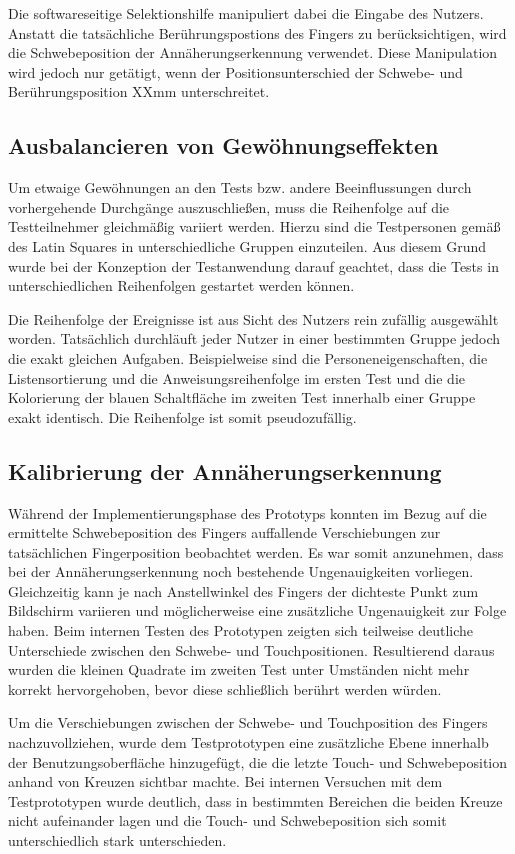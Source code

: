 \documentclass[a4paper,12pt,bibliography=totoc]{scrreprt}%
\begin{document}
Die softwareseitige Selektionshilfe manipuliert dabei die Eingabe des Nutzers. Anstatt die tatsächliche Berührungspostions des Fingers zu berücksichtigen, wird die Schwebeposition der Annäherungserkennung verwendet. Diese Manipulation wird jedoch nur getätigt, wenn der Positionsunterschied der Schwebe- und Berührungsposition XXmm unterschreitet.

\subsection{Ausbalancieren von Gewöhnungseffekten}
Um etwaige Gewöhnungen an den Tests bzw. andere Beeinflussungen durch vorhergehende Durchgänge auszuschließen, muss die Reihenfolge auf die Testteilnehmer gleichmäßig variiert werden. Hierzu sind die Testpersonen gemäß des Latin Squares in unterschiedliche Gruppen einzuteilen. Aus diesem Grund wurde bei der Konzeption der Testanwendung darauf geachtet, dass die Tests in unterschiedlichen Reihenfolgen gestartet werden können.

Die Reihenfolge der Ereignisse ist aus Sicht des Nutzers rein zufällig ausgewählt worden. Tatsächlich durchläuft jeder Nutzer in einer bestimmten Gruppe jedoch die exakt gleichen Aufgaben. Beispielweise sind die Personeneigenschaften, die Listensortierung und die Anweisungsreihenfolge im ersten Test und die die Kolorierung der blauen Schaltfläche im zweiten Test innerhalb einer Gruppe exakt identisch. Die Reihenfolge ist somit pseudozufällig.

\subsection{Kalibrierung der Annäherungserkennung}
Während der Implementierungsphase des Prototyps konnten im Bezug auf die ermittelte Schwebeposition des Fingers auffallende  Verschiebungen zur tatsächlichen Fingerposition beobachtet werden. Es war somit anzunehmen, dass bei der Annäherungserkennung noch bestehende Ungenauigkeiten vorliegen. Gleichzeitig kann je nach Anstellwinkel des Fingers der dichteste Punkt zum Bildschirm variieren und möglicherweise eine zusätzliche Ungenauigkeit zur Folge haben. Beim internen Testen des Prototypen zeigten sich teilweise deutliche Unterschiede zwischen den Schwebe- und Touchpositionen. Resultierend daraus wurden die kleinen Quadrate im zweiten Test unter Umständen nicht mehr korrekt hervorgehoben, bevor diese schließlich berührt werden würden.

Um die Verschiebungen zwischen der Schwebe- und Touchposition des Fingers nachzuvollziehen, wurde dem Testprototypen eine zusätzliche Ebene innerhalb der Benutzungsoberfläche hinzugefügt, die die letzte Touch- und Schwebeposition anhand von Kreuzen sichtbar machte. Bei internen Versuchen mit dem Testprototypen wurde deutlich, dass in bestimmten Bereichen die beiden Kreuze nicht aufeinander lagen und die Touch- und Schwebeposition sich somit unterschiedlich stark unterschieden.
\end{document}
